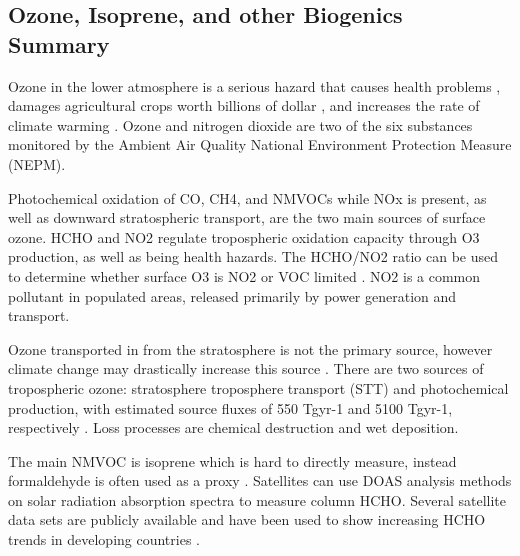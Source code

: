 \subsection{Ozone, Isoprene, and other Biogenics Summary}
Ozone in the lower atmosphere is a serious hazard that causes health problems \cite{Hsieh_2013}, damages agricultural crops worth billions of dollar \cite{Avnery_2011}, and increases the rate of climate warming \cite{IPCC_2013_chap8}. 
Ozone and nitrogen dioxide are two of the six substances monitored by the Ambient Air Quality National Environment Protection Measure (NEPM). 
  
Photochemical oxidation of CO, CH4, and NMVOCs while NOx is present, as well as downward stratospheric transport, are the two main sources of surface ozone.
HCHO and NO2 regulate tropospheric oxidation capacity through O3 production, as well as being health hazards.
The HCHO/NO2 ratio can be used to determine whether surface O3 is NO2 or VOC limited \cite{Mahajan_2015}.
NO2 is a common pollutant in populated areas, released primarily by power generation and transport.

Ozone transported in from the stratosphere is not the primary source, however climate change may drastically increase this source \cite{Hegglin_2009}.
There are two sources of tropospheric ozone: stratosphere troposphere transport (STT) and photochemical production, with estimated source fluxes of 550 Tgyr-1 and 5100 Tgyr-1, respectively \cite{Stevenson_2006}. 
Loss processes are chemical destruction and wet deposition.

The main NMVOC is isoprene \cite{Guenther_2006} which is hard to directly measure, instead formaldehyde is often used as a proxy \cite{Marais_2012,bauwens2013satellite}. 
Satellites can use DOAS analysis methods on solar radiation absorption spectra to measure column HCHO.
Several satellite data sets are publicly available and have been used to show increasing HCHO trends in developing countries \cite{Mahajan_2015}.
  
  
  
  